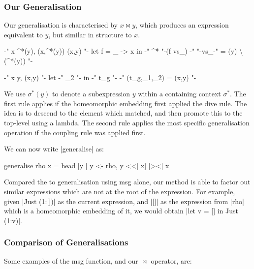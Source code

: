\subsubsection{Our Generalisation}

Our generalisation is characterised by $x \bowtie y$, which produces an expression equivalent to $y$, but similar in structure to $x$.

\ind{||><||}
\ignore\begin{code}
{-" x \bowtie \sigma^*(y), (x,\sigma^*(y)) \wedge {}(x,y) "-}
        let f = \vs_ -> x in {-" \sigma^* "-}(f vs_)
        {-"  "-}vs_{-" = (y) \backslash {}(\sigma^*(y)) "-}

{-" x \bowtie y, (x,y) "-}
        let {-" \theta_2 "-} in {-" t_g "-}
        {-" (t_g,\theta_1,\theta_2) = (x,y) "-}
\end{code}

We use $\sigma^*(y)$ to denote a subexpression $y$ within a containing context $\sigma^*$. The first rule applies if the homeomorphic embedding first applied the dive rule. The idea is to descend to the element which matched, and then promote this to the top-level using a lambda. The second rule applies the most specific generalisation operation if the coupling rule was applied first.

We can now write |generalise| as:

\begin{code}
generalise rho x = head [y | y <- rho, y <<| x] |><| x
\end{code}

Compared the to generalisation using msg alone, our method is able to factor out similar expressions which are not at the root of the expression. For example, given |Just (1:[])| as the current expression, and |[]| as the expression from |rho| which is a homeomorphic embedding of it, we would obtain |let v = [] in Just (1:v)|.

\subsubsection{Comparison of Generalisations}

Some examples of the msg function, and our $\bowtie$ operator, are:

